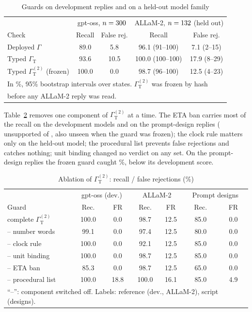 \documentclass[conference]{IEEEtran}
\begin{document}
\begin{table}[t]
\caption{Guards on development replies and on a held-out model family}
\label{tab:heldout}
\centering
\footnotesize
\setlength{\tabcolsep}{2.2pt}
\begin{tabular}{lcccc}
\toprule
 & \multicolumn{2}{c}{gpt-oss, $n=300$} & \multicolumn{2}{c}{ALLaM-2, $n=132$ (held out)}\\
Check & Recall & False rej. & Recall & False rej.\\
\midrule
Deployed $\Gamma$ & 89.0 & 5.8 & 96.1 (91--100) & 7.1 (2--15)\\
Typed $\Gamma_{\mathrm{T}}$ & 93.6 & 10.5 & 100.0 (100--100) & 17.9 (8--29)\\
Typed $\Gamma_{\mathrm{T}}^{(2)}$ (frozen) & 100.0 & 0.0 & 98.7 (96--100) & 12.5 (4--23)\\
\bottomrule
\multicolumn{5}{l}{\scriptsize In \%, 95\% bootstrap intervals over states. $\Gamma_{\mathrm{T}}^{(2)}$ was frozen by hash}\\
\multicolumn{5}{l}{\scriptsize before any ALLaM-2 reply was read.}\\
\end{tabular}
\end{table}

Table~\ref{tab:ablation} removes one component of $\Gamma_{\mathrm{T}}^{(2)}$ at a time. The ETA ban carries most of the recall on the development models and on the prompt-design replies (\AbVarUnsup{} unsupported of \TaxVarN, also unseen when the guard was frozen); the clock rule matters only on the held-out model; the procedural list prevents false rejections and catches nothing; unit binding changed no verdict on any set. On the prompt-design replies the frozen guard caught \AbFullVarRec\%, below its development score.

\begin{table}[t]
\caption{Ablation of $\Gamma_{\mathrm{T}}^{(2)}$: recall / false rejections (\%)}
\label{tab:ablation}
\centering
\footnotesize
\setlength{\tabcolsep}{2.6pt}
\begin{tabular}{lcccccc}
\toprule
 & \multicolumn{2}{c}{gpt-oss (dev.)} & \multicolumn{2}{c}{ALLaM-2} & \multicolumn{2}{c}{Prompt designs}\\
Guard & Rec. & FR & Rec. & FR & Rec. & FR\\
\midrule
complete $\Gamma_{\mathrm{T}}^{(2)}$ & 100.0 & 0.0 & 98.7 & 12.5 & 85.0 & 0.0\\
\midrule
-- number words & 99.1 & 0.0 & 97.4 & 12.5 & 80.0 & 0.0\\
-- clock rule & 100.0 & 0.0 & 92.1 & 12.5 & 85.0 & 0.0\\
-- unit binding & 100.0 & 0.0 & 98.7 & 12.5 & 85.0 & 0.0\\
-- ETA ban & 85.3 & 0.0 & 98.7 & 12.5 & 65.0 & 0.0\\
-- procedural list & 100.0 & 18.8 & 100.0 & 16.1 & 85.0 & 4.9\\
\bottomrule
\multicolumn{7}{l}{\scriptsize ``--'': component switched off. Labels: reference (dev., ALLaM-2), script (designs).}\\
\end{tabular}
\end{table}
\end{document}
